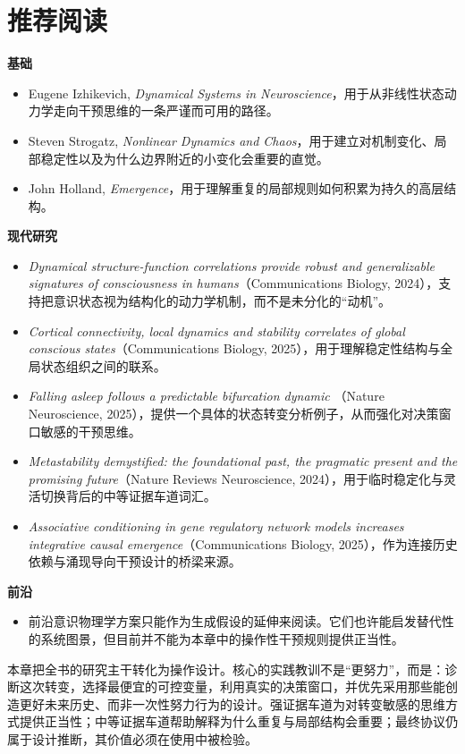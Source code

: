 \section{推荐阅读}

\begin{readingbox}
\textbf{基础}
\begin{itemize}[nosep]
  \item Eugene Izhikevich, \emph{Dynamical Systems in Neuroscience}，用于从非线性状态动力学走向干预思维的一条严谨而可用的路径。
  \item Steven Strogatz, \emph{Nonlinear Dynamics and Chaos}，用于建立对机制变化、局部稳定性以及为什么边界附近的小变化会重要的直觉。
  \item John Holland, \emph{Emergence}，用于理解重复的局部规则如何积累为持久的高层结构。
\end{itemize}
\textbf{现代研究}
\begin{itemize}[nosep]
  \item \emph{Dynamical structure-function correlations provide robust and
        generalizable signatures of consciousness in humans}（Communications
        Biology, 2024），支持把意识状态视为结构化的动力学机制，而不是未分化的“动机”。
  \item \emph{Cortical connectivity, local dynamics and stability correlates of
        global conscious states}（Communications Biology, 2025），用于理解稳定性结构与全局状态组织之间的联系。
  \item \emph{Falling asleep follows a predictable bifurcation dynamic}
        （Nature Neuroscience, 2025），提供一个具体的状态转变分析例子，从而强化对决策窗口敏感的干预思维。
  \item \emph{Metastability demystified: the foundational past, the pragmatic
        present and the promising future}（Nature Reviews Neuroscience, 2024），用于临时稳定化与灵活切换背后的中等证据车道词汇。
  \item \emph{Associative conditioning in gene regulatory network models
        increases integrative causal emergence}（Communications Biology, 2025），作为连接历史依赖与涌现导向干预设计的桥梁来源。
\end{itemize}
\textbf{前沿}
\begin{itemize}[nosep]
  \item 前沿意识物理学方案只能作为生成假设的延伸来阅读。它们也许能启发替代性的系统图景，但目前并不能为本章中的操作性干预规则提供正当性。
\end{itemize}
\end{readingbox}

\begin{summarybox}
本章把全书的研究主干转化为操作设计。核心的实践教训不是“更努力”，而是：诊断这次转变，选择最便宜的可控变量，利用真实的决策窗口，并优先采用那些能创造更好未来历史、而非一次性努力行为的设计。强证据车道为对转变敏感的思维方式提供正当性；中等证据车道帮助解释为什么重复与局部结构会重要；最终协议仍属于设计推断，其价值必须在使用中被检验。
\end{summarybox}